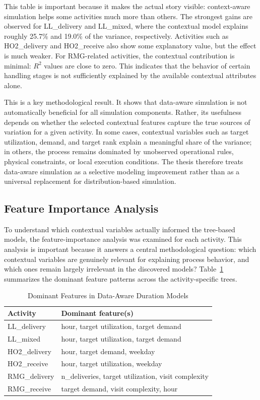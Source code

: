 This table is important because it makes the actual story visible: context-aware simulation helps some activities much more than others. The strongest gains are observed for LL\_delivery and LL\_mixed, where the contextual model explains roughly 25.7\% and 19.0\% of the variance, respectively. Activities such as HO2\_delivery and HO2\_receive also show some explanatory value, but the effect is much weaker. For RMG-related activities, the contextual contribution is minimal: $R^2$ values are close to zero. This indicates that the behavior of certain handling stages is not sufficiently explained by the available contextual attributes alone.

This is a key methodological result. It shows that data-aware simulation is not automatically beneficial for all simulation components. Rather, its usefulness depends on whether the selected contextual features capture the true sources of variation for a given activity. In some cases, contextual variables such as target utilization, demand, and target rank explain a meaningful share of the variance; in others, the process remains dominated by unobserved operational rules, physical constraints, or local execution conditions. The thesis therefore treats data-aware simulation as a selective modeling improvement rather than as a universal replacement for distribution-based simulation.

\subsection{Feature Importance Analysis}
\label{sec:feature_importance_results}

To understand which contextual variables actually informed the tree-based models, the feature-importance analysis was examined for each activity. This analysis is important because it answers a central methodological question: which contextual variables are genuinely relevant for explaining process behavior, and which ones remain largely irrelevant in the discovered models? Table~\ref{tab:feature_importance_summary} summarizes the dominant feature patterns across the activity-specific trees.

\begin{table}[h!]
\centering
\caption{Dominant Features in Data-Aware Duration Models}
\label{tab:feature_importance_summary}
\begin{tabular}{ll}
\toprule
Activity & Dominant feature(s) \\
\midrule
LL\_delivery & hour, target utilization, target demand \\
LL\_mixed & hour, target utilization, target demand \\
HO2\_delivery & hour, target demand, weekday \\
HO2\_receive & hour, target utilization, weekday \\
RMG\_delivery & n\_deliveries, target utilization, visit complexity \\
RMG\_receive & target demand, visit complexity, hour \\
\bottomrule
\end{tabular}
\end{table}

